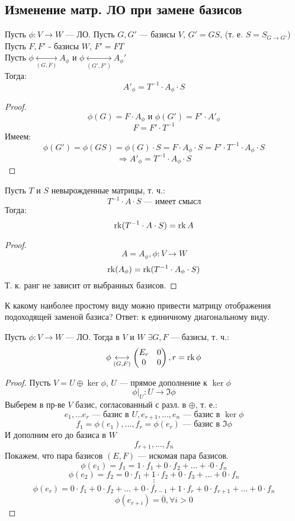 \subsection{Изменение матр. ЛО при замене базисов}
\begin{theorem}
\label{th:4}
Пусть $\phi: V \rightarrow W$ --- ЛО. Пусть $G, G'$ --- базисы $V$, $G' = GS$, (т. е. $S = S_{G\to G'}$) \\
Пусть $F, F'$ - базисы $W$, $F' = FT$ \\
Пусть $\phi \underset{(G, F)}{\longleftrightarrow} A_{\phi}$ и $\phi \underset{(G', F')}{\longleftrightarrow} A_{\phi}'$ \\
Тогда:
\[
A'_\phi = T^{-1}\cdot A_\phi \cdot S
\]
\end{theorem}
\begin{proof}
\[
\phi(G) = F \cdot A_\phi \text{ и } \phi(G') = F' \cdot A'_\phi
\]
\[
F = F' \cdot T^{-1}
\]
Имеем:
\[
\phi(G') = \phi(GS) = \phi(G) \cdot S = F \cdot A_\phi \cdot S = F' \cdot T^{-1} \cdot A_{\phi} \cdot S
\]
\[
 \Rightarrow A'_\phi = T^{-1} \cdot A_\phi \cdot S
\]
\end{proof}
\begin{consequence}
Пусть $T$ и $S$ невырожденные матрицы, т. ч.:
\[
T^{-1} \cdot A \cdot S \text{ --- имеет смысл}
\]
Тогда:
\[
  \operatorname{rk} (T^{-1} \cdot A \cdot S) = \operatorname{rk} A
\]
\end{consequence}
\begin{proof}
  \[
    A = A_\phi, \phi \colon V \rightarrow W
  \]
\[
  \operatorname{rk}(A_\phi) = \operatorname{rk} (T^{-1} \cdot A_\phi \cdot S)
\]
Т. к. ранг не зависит от выбранных базисов.
\end{proof}
К какому наиболее простому виду можно привести матрицу отображения подоходящей заменой базиса? Ответ: к единичному диагональному виду.
\begin{theorem}
\label{th:5}
Пусть $\phi \colon V \rightarrow W$ --- ЛО. Тогда в $V$ и $W$ $\exists G, F$ --- базисы, т. ч.:
\[
  \phi \underset{(G, F)}{\longleftrightarrow} \begin{pmatrix}E_r & 0 \\ 0 & 0 \end{pmatrix}, r = \operatorname{rk} \phi
\]
\begin{proof}
Пусть $V = U \oplus \ker \phi$, $U$ --- прямое дополнение к $\ker \phi$
\[
\phi|_U \colon U \rightarrow \Im \phi
\]
Выберем в пр-ве $V$ базис, согласованный с разл. в $\oplus$, т. е.:
\[
e_1, \ldots e_r \text{ --- базис в $U$}, e_{r + 1}, \ldots, e_n \text{ --- базис в $\ker \phi$}
\]
\[
f_1 = \phi(e_1), \ldots, f_r = \phi(e_r) \text{ --- базис в $\Im \phi$}
\]
И дополним его до базиса в $W$
\[
f_{r + 1}, \ldots, f_n
\]
Покажем, что пара базисов $(E, F)$ --- искомая пара базисов.
\[
\phi(e_1) = f_1 = 1 \cdot f_1 + 0 \cdot f_2 + \ldots + \cdot 0 \cdot f_n
\]
\[
\phi(e_2) = f_2 = 0 \cdot f_1 + 1 \cdot f_2 + 0 \cdot f_3 + \ldots + 0 \cdot f_n
\]
\[
\vdots
\]
\[
\phi(e_r) = 0 \cdot f_1 + 0 \cdot f_2 + \ldots + 0 \cdot f_{r - 1} + 1 \cdot f_r + 0 \cdot f_{r + 1} + \ldots + 0 \cdot f_n
\]
\[
\phi(e_{r + i}) = \overline{0}, \forall i > 0
\]
\end{proof}
\end{theorem}
